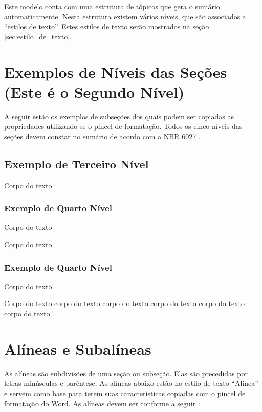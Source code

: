 \documentclass[
        oneside,      %
        english,			
        brazil			 
        ]{configcefetmglpd}
\begin{document}
Este modelo conta com uma estrutura de tópicos que gera o sumário automaticamente. Nesta estrutura existem vários níveis, que são associados a “estilos de texto”. Estes estilos de texto serão mostrados na seção \ref{sec:estilo_de_texto}. %

\section{Exemplos de Níveis das Seções (Este é o Segundo Nível)} %
\label{sec:exemplos_niveis_secao}
A seguir estão os exemplos de subseções dos quais podem ser copiadas as propriedades utilizando-se o pincel de formatação. Todos os cinco níveis das seções devem constar no sumário de acordo com a NBR 6027 \cite{bib:abnt6027}.

\subsection{Exemplo de Terceiro Nível} %
Corpo do texto

\subsubsection{Exemplo de Quarto Nível} %
Corpo do texto

Corpo do texto

\subsubsection{Exemplo de Quarto Nível}
Corpo do texto

Corpo do texto corpo do texto corpo do texto corpo do texto corpo do texto corpo do texto.

\section{Alíneas e Subalíneas} \label{sec:alineas_subalineas}
As alíneas são subdivisões de uma seção ou subseção. Elas são precedidas por letras minúsculas e parêntese. As alíneas abaixo estão no estilo de texto “Alínea” e servem como base para terem suas características copiadas com o pincel de formatação do Word. As alíneas devem ser conforme a seguir \cite{bib:abnt6027}:
\end{document}
